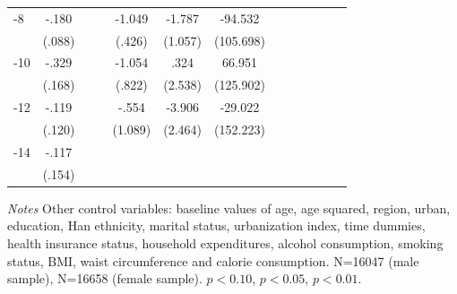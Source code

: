 \begin{table}[!ht]
\begin{adjustbox}{max width=\linewidth}
\begin{threeparttable}
{\begin{tabular}{l*{6}{S
S}}
-8             &    -.180\sym{**} &         &         &   -1.049\sym{**} &   -1.787\sym{*}  &  -94.532         \\
                &   (.088)         &         &         &   (.426)         &  (1.057)         &(105.698)         \\
-10            &    -.329\sym{*}  &         &         &   -1.054         &     .324         &   66.951         \\
                &   (.168)         &         &         &   (.822)         &  (2.538)         &(125.902)         \\
-12           &    -.119         &         &         &    -.554         &   -3.906         &  -29.022         \\
                &   (.120)         &         &         &  (1.089)         &  (2.464)         &(152.223)         \\
-14           &    -.117         &         &         &                  &                  &                  \\
                &   (.154)         &         &         &                  &                  &                  \\
\bottomrule
\end{tabular}
\begin{tablenotes}
\item \textit{Notes} Other control variables: baseline values of age, age squared, region, urban, education, Han ethnicity, marital status, urbanization index, time dummies, health insurance status, household expenditures, alcohol consumption, smoking status, BMI, waist circumference and calorie consumption. N=16047 (male sample), N=16658 (female sample). \sym{*} \(p<0.10\), \sym{**} \(p<0.05\), \sym{***} \(p<0.01\).
\end{tablenotes}
}
\end{threeparttable}
\end{adjustbox}
\end{table}


